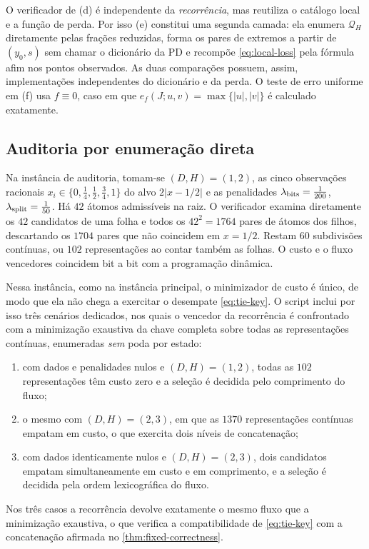 \documentclass[11pt,a4paper]{article}
\theoremstyle{definition}
\theoremstyle{remark}
\begin{document}
O verificador de (d) é independente da \emph{recorrência}, mas reutiliza o
catálogo local e a função de perda. Por isso (e) constitui uma segunda camada:
ela enumera $\mathcal Q_H$ diretamente pelas frações reduzidas, forma os pares
de extremos a partir de $(y_0,s)$ sem chamar o dicionário da PD e recompõe
\eqref{eq:local-loss} pela fórmula afim nos pontos observados. As duas
comparações possuem, assim, implementações independentes do dicionário e da
perda. O teste de erro uniforme em (f) usa $f\equiv0$, caso em que
$e_f(J;u,v)=\max\{|u|,|v|\}$ é calculado exatamente.

\subsection{Auditoria por enumeração direta}

Na instância de auditoria, tomam-se $(D,H)=(1,2)$, as cinco observações
racionais $x_i\in\{0,\tfrac14,\tfrac12,\tfrac34,1\}$ do alvo $2|x-1/2|$ e as
penalidades $\lambda_{\rm bits}=\tfrac1{200}$,
$\lambda_{\rm split}=\tfrac1{50}$. Há $42$ átomos admissíveis na
raiz. O verificador examina diretamente os $42$ candidatos de uma folha e
todos os $42^2=1764$ pares de átomos dos filhos, descartando os $1704$ pares
que não coincidem em $x=1/2$. Restam $60$ subdivisões contínuas, ou $102$
representações ao contar também as folhas. O custo e o fluxo vencedores
coincidem bit a bit com a programação dinâmica.

Nessa instância, como na instância principal, o minimizador de custo é único,
de modo que ela não chega a exercitar o desempate \eqref{eq:tie-key}. O script
inclui por isso três cenários dedicados, nos quais o vencedor da recorrência é
confrontado com a minimização exaustiva da chave completa sobre todas as
representações contínuas, enumeradas \emph{sem} poda por estado:
\begin{enumerate}[label=(\alph*),leftmargin=2em]
 \item com dados e penalidades nulos e $(D,H)=(1,2)$, todas as $102$
 representações têm custo zero e a seleção é decidida pelo comprimento do
 fluxo;
 \item o mesmo com $(D,H)=(2,3)$, em que as $1370$ representações contínuas
 empatam em custo, o que exercita dois níveis de concatenação;
 \item com dados identicamente nulos e $(D,H)=(2,3)$, dois candidatos empatam
 simultaneamente em custo e em comprimento, e a seleção é decidida pela ordem
 lexicográfica do fluxo.
\end{enumerate}
Nos três casos a recorrência devolve exatamente o mesmo fluxo que a
minimização exaustiva, o que verifica a compatibilidade de \eqref{eq:tie-key}
com a concatenação afirmada no \cref{thm:fixed-correctness}.
\end{document}
